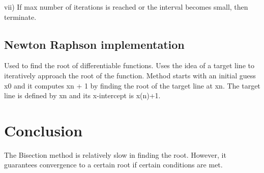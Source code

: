 \documentclass[10pt,a4paper,oneside]{article}
\begin{document}
vii) If max number of iterations is reached or the interval becomes small, then terminate.
\subsection{Newton Raphson implementation}
Used to find the root of differentiable functions.
Uses the idea of a target line to iteratively approach the root of the function.
Method starts with an initial guess x0 and it computes xn + 1 by finding the root of the target line at xn.
The target line is defined by xn and its x-intercept is x(n)+1.
\section*{Conclusion}
The Bisection method is relatively slow in finding the root. However, it guarantees convergence to a certain root if certain conditions are met.
\end{document}
